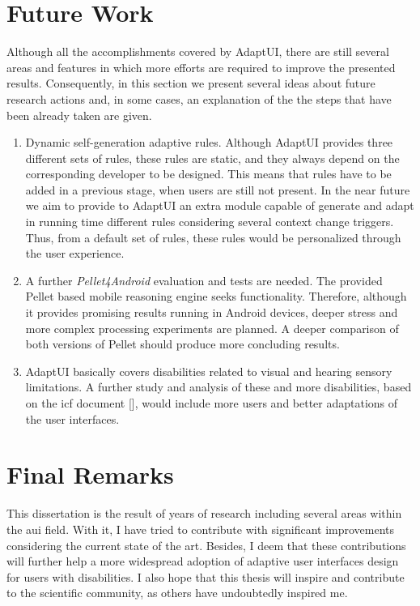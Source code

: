 \section{Future Work}
\label{sec:future_work}

Although all the accomplishments covered by AdaptUI, there are still several 
areas and features in which more efforts are required to improve the presented 
results. Consequently, in this section we present several ideas about future 
research actions and, in some cases, an explanation of the the steps that have 
been already taken are given.

\begin{enumerate}[label=\alph*)]
  \item Dynamic self-generation adaptive rules. Although AdaptUI provides three 
  different sets of rules, these rules are static, and they always depend on 
  the corresponding developer to be designed. This means that rules have to 
  be added in a previous stage, when users are still not present. In the near 
  future we aim to provide to AdaptUI an extra module capable of generate and 
  adapt in running time different rules considering several context change 
  triggers. Thus, from a default set of rules, these rules would be personalized 
  through the user experience.
  
  \item A further \textit{Pellet4Android} evaluation and tests are needed. The
  provided Pellet based mobile reasoning engine seeks functionality. Therefore,
  although it provides promising results running in Android devices, deeper 
  stress and  more complex processing experiments are planned. A deeper
  comparison of both versions of Pellet should produce more concluding results.
  
  \item AdaptUI basically covers disabilities related to visual and hearing
  sensory limitations. A further study and analysis of these and more 
  disabilities, based on the \ac{icf} document [], would include more users and 
  better adaptations of the user interfaces.
\end{enumerate}

\section{Final Remarks}
\label{sec:final_remarks}

This dissertation is the result of years of research including several areas
within the \acl{aui} field. With it, I have tried to contribute
with significant improvements considering the current state of the art. Besides,
I deem that these contributions will further help a more widespread adoption of 
adaptive user interfaces design for users with disabilities. I also hope that 
this thesis will inspire and contribute to the scientific community, as others 
have undoubtedly inspired me. 


